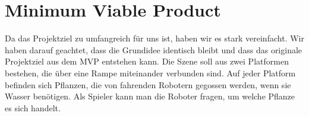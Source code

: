 \section{Minimum Viable Product}

Da das Projektziel zu umfangreich für uns ist, haben wir es stark vereinfacht. Wir haben darauf geachtet, dass die Grundidee identisch bleibt und dass das originale Projektziel aus dem MVP entstehen kann. Die Szene soll aus zwei Platformen bestehen, die über eine Rampe miteinander verbunden sind. Auf jeder Platform befinden sich Pflanzen, die von fahrenden Robotern gegossen werden, wenn sie Wasser benötigen. Als Spieler kann man die Roboter fragen, um welche Pflanze es sich handelt.